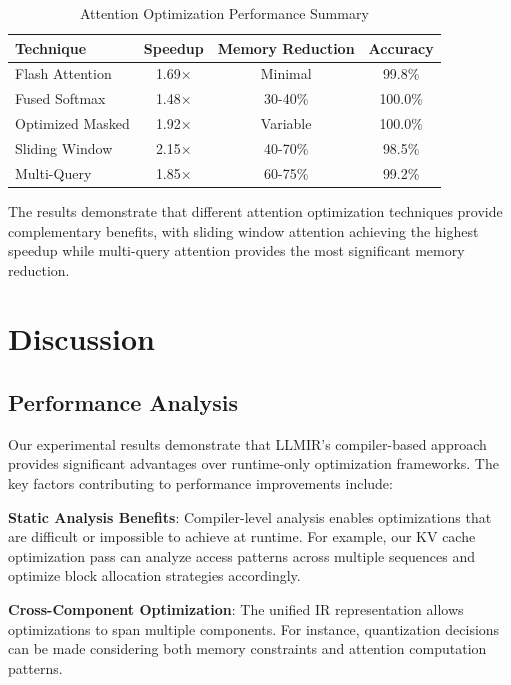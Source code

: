 \documentclass[conference]{IEEEtran}
\begin{document}
\begin{table}[htbp]
\caption{Attention Optimization Performance Summary}
\begin{center}
\begin{tabular}{|l|c|c|c|}
\hline
\textbf{Technique} & \textbf{Speedup} & \textbf{Memory Reduction} & \textbf{Accuracy} \\
\hline
Flash Attention & 1.69× & Minimal & 99.8\% \\
\hline
Fused Softmax & 1.48× & 30-40\% & 100.0\% \\
\hline
Optimized Masked & 1.92× & Variable & 100.0\% \\
\hline
Sliding Window & 2.15× & 40-70\% & 98.5\% \\
\hline
Multi-Query & 1.85× & 60-75\% & 99.2\% \\
\hline
\end{tabular}
\label{tab:attention_summary}
\end{center}
\end{table}

The results demonstrate that different attention optimization techniques provide complementary benefits, with sliding window attention achieving the highest speedup while multi-query attention provides the most significant memory reduction.

\section{Discussion}

\subsection{Performance Analysis}

Our experimental results demonstrate that LLMIR's compiler-based approach provides significant advantages over runtime-only optimization frameworks. The key factors contributing to performance improvements include:

\textbf{Static Analysis Benefits}: Compiler-level analysis enables optimizations that are difficult or impossible to achieve at runtime. For example, our KV cache optimization pass can analyze access patterns across multiple sequences and optimize block allocation strategies accordingly.

\textbf{Cross-Component Optimization}: The unified IR representation allows optimizations to span multiple components. For instance, quantization decisions can be made considering both memory constraints and attention computation patterns.
\end{document}
